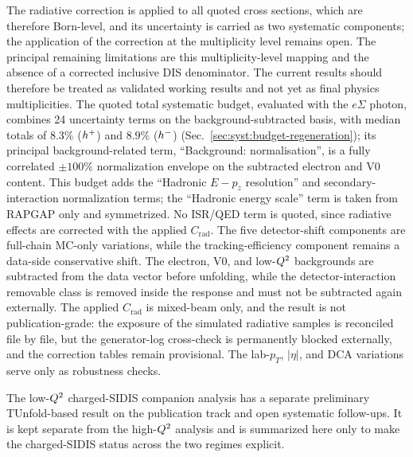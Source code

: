 The radiative correction is applied to all quoted cross sections, which are
therefore Born-level, and its uncertainty is carried as two systematic
components; the application of the correction at the multiplicity level remains
open.  The principal remaining limitations are this multiplicity-level mapping
and the absence of a corrected inclusive DIS denominator.
The current results should therefore be treated as validated working results
and not yet as final physics multiplicities.  The quoted total systematic
budget, evaluated with the $e\Sigma$ photon,
combines 24 uncertainty terms on the background-subtracted basis, with
median totals of $8.3\%$ ($h^{+}$) and $8.9\%$ ($h^{-}$)
(Sec.~\ref{sec:syst:budget-regeneration}); its
principal background-related term, ``Background: normalisation'', is a fully correlated $\pm100\%$
normalization envelope on the subtracted electron and V0 content.  This budget adds the ``Hadronic $E-p_z$ resolution'' and secondary-interaction normalization terms;
the ``Hadronic energy scale'' term is taken from RAPGAP only and symmetrized.  No ISR/QED term is
quoted, since radiative effects are corrected with the applied $C_{\mathrm{rad}}$.
The five detector-shift components are full-chain MC-only variations,
while the tracking-efficiency component remains a data-side conservative
shift.  The electron, V0, and low-$Q^{2}$ backgrounds are subtracted from the
data vector before unfolding, while the detector-interaction removable class is
removed inside the response and must not be subtracted again externally.  The
applied $C_{\mathrm{rad}}$ is
mixed-beam only, and the result is not publication-grade: the exposure of the
simulated radiative samples is reconciled file by file, but the generator-log
cross-check is permanently blocked externally, and the correction tables
remain provisional.  The lab-$p_T$, $|\eta|$, and DCA variations serve only as
robustness checks.

The low-$Q^{2}$ charged-SIDIS companion analysis has a separate preliminary
TUnfold-based result on the publication track and open systematic follow-ups.  It is
kept separate from the high-$Q^{2}$ analysis and is summarized here only to make
the charged-SIDIS status across the two regimes explicit.
